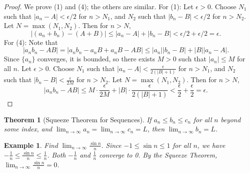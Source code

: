 \documentclass[11pt,a4paper]{article}
\newtheorem{example}{Example}
\newtheorem{theorem}{Theorem}
\begin{document}
\begin{proof}
We prove (1) and (4); the others are similar.
For (1): Let $\epsilon > 0$. Choose $N_1$ such that $|a_n - A| < \epsilon/2$ for $n > N_1$, and $N_2$ such that $|b_n - B| < \epsilon/2$ for $n > N_2$. Let $N = \max(N_1, N_2)$. Then for $n > N$,
\[
|(a_n + b_n) - (A + B)| \leq |a_n - A| + |b_n - B| < \epsilon/2 + \epsilon/2 = \epsilon.
\]
For (4): Note that
\[
|a_n b_n - AB| = |a_n b_n - a_n B + a_n B - AB| \leq |a_n||b_n - B| + |B||a_n - A|.
\]
Since $\{a_n\}$ converges, it is bounded, so there exists $M > 0$ such that $|a_n| \leq M$ for all $n$. Let $\epsilon > 0$. Choose $N_1$ such that $|a_n - A| < \frac{\epsilon}{2(|B|+1)}$ for $n > N_1$, and $N_2$ such that $|b_n - B| < \frac{\epsilon}{2M}$ for $n > N_2$. Let $N = \max(N_1, N_2)$. Then for $n > N$,
\[
|a_n b_n - AB| \leq M \cdot \frac{\epsilon}{2M} + |B| \cdot \frac{\epsilon}{2(|B|+1)} < \frac{\epsilon}{2} + \frac{\epsilon}{2} = \epsilon.
\]
\end{proof}
\begin{theorem}[Squeeze Theorem for Sequences]
If $a_n \leq b_n \leq c_n$ for all $n$ beyond some index, and $\lim_{n \to \infty} a_n = \lim_{n \to \infty} c_n = L$, then $\lim_{n \to \infty} b_n = L$.
\end{theorem}
\begin{example}
Find $\displaystyle \lim_{n \to \infty} \frac{\sin n}{n}$.
Since $-1 \leq \sin n \leq 1$ for all $n$, we have $-\frac{1}{n} \leq \frac{\sin n}{n} \leq \frac{1}{n}$. Both $-\frac{1}{n}$ and $\frac{1}{n}$ converge to 0. By the Squeeze Theorem, $\lim_{n \to \infty} \frac{\sin n}{n} = 0$.
\end{example}
\end{document}
